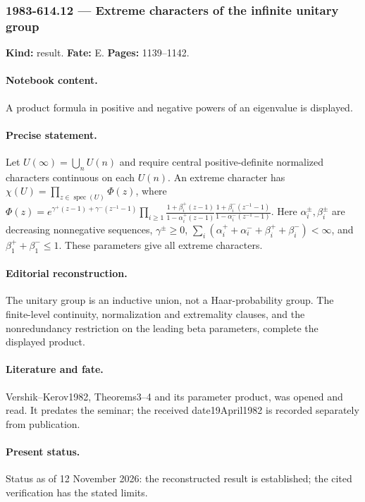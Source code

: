 \subsubsection{1983-614.12 --- Extreme characters of the infinite unitary group}

\label{item:1983-614.12}

\noindent\textbf{Kind:} result. \textbf{Fate:} E. \textbf{Pages:} 1139--1142.\par

\paragraph{Notebook content.} A product formula in positive and negative powers of an eigenvalue is displayed.

\paragraph{Precise statement.} Let $U(\infty)=\bigcup_nU(n)$ and require central positive-definite normalized characters continuous on each $U(n)$. An extreme character has $\chi(U)=\prod_{z\in\operatorname{spec}(U)}\Phi(z)$, where $\Phi(z)=e^{\gamma^+(z-1)+\gamma^-(z^{-1}-1)}\prod_{i\ge1}\frac{1+\beta_i^+(z-1)}{1-\alpha_i^+(z-1)}\frac{1+\beta_i^-(z^{-1}-1)}{1-\alpha_i^-(z^{-1}-1)}$. Here $\alpha_i^\pm,\beta_i^\pm$ are decreasing nonnegative sequences, $\gamma^\pm\ge0$, $\sum_i(\alpha_i^++\alpha_i^-+\beta_i^++\beta_i^-)<\infty$, and $\beta_1^++\beta_1^-\le1$. These parameters give all extreme characters.

\paragraph{Editorial reconstruction.} The unitary group is an inductive union, not a Haar-probability group. The finite-level continuity, normalization and extremality clauses, and the nonredundancy restriction on the leading beta parameters, complete the displayed product.

\paragraph{Literature and fate.} Vershik--Kerov1982, Theorems3--4 and its parameter product, was opened and read. It predates the seminar; the received date19April1982 is recorded separately from publication.

\paragraph{Present status.} Status as of 12 November 2026: the reconstructed result is established; the cited verification has the stated limits.

